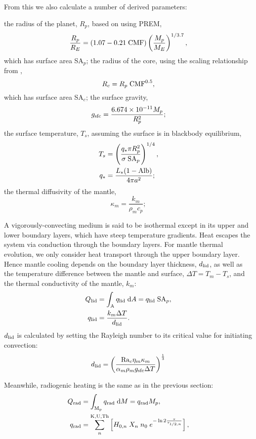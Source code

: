 \documentclass[10pt,a4paper]{article}
\begin{document}
From this we also calculate a number of derived parameters:

the radius of the planet, $R_p$, based on \citet{Zeng2016} using PREM,
\begin{equation}
\frac{R_p}{R_E} = (1.07 - 0.21\; {\rm CMF})\left(\frac{M_p}{M_E}\right)^{1/3.7},
\end{equation}
which has surface area SA$_p$; the radius of the core, using the scaling relationship from \citet{Zeng2017},
\begin{equation}
R_c = R_p \; {\rm CMF}^{0.5},
\end{equation}
which has surface area SA$_c$; the surface gravity,
\begin{equation}
g_{\rm sfc} =\frac{6.674\times 10^{-11}M_p}{R_p^2};
\end{equation}
the surface temperature, $T_s$, assuming the surface is in blackbody equilibrium,
\begin{align}
T_s &= \left(\frac{q_* \pi R_p^2}{\sigma \; {\rm SA}_p}\right)^{1/4},\\
q_* &= \frac{L_*(1-{\rm Alb})}{4 \pi a^2};
\end{align}
the thermal diffusivity of the mantle,
\begin{equation}
\kappa_m = \frac{k_m}{\rho_m c_p};
\end{equation}

A vigorously-convecting medium is said to be isothermal except in its upper and lower boundary layers, which have steep temperature gradients.  Heat escapes the system via conduction through the boundary layers. For mantle thermal evolution, we only consider heat transport through the upper boundary layer. Hence mantle cooling depends on the boundary layer thickness, $d_{\rm lid}$, as well as the temperature difference between the mantle and surface, $\Delta T = T_m - T_s$, and the thermal conductivity of the mantle, $k_m$:
\begin{align}
Q_{\rm lid} &= \int_{\rm A} q_{\rm lid} \; {\rm d}A = q_{\rm lid} \; {\rm SA}_p,\\
q_{\rm lid} &= \frac{k_m \Delta T}{d_{\rm lid}}.
\end{align}
$d_{\rm lid}$ is calculated by setting the Rayleigh number to its critical value for initiating convection:
\begin{equation}
d_{\rm lid} = \left(\frac{{\rm Ra}_c \eta_m \kappa_m}{\alpha_m \rho_m g_{\rm sfc} \Delta T}\right)^{\frac{1}{3}}
\end{equation}

Meanwhile, radiogenic heating is the same as in the previous section:
\begin{align}
Q_{\rm rad} &= \int_{\rm M_p} q_{\rm rad} \; {\rm d}M = q_{\rm rad} M_p,\\
q_{\rm rad} &= \sum^{\rm K, U, Th}_n \left[ H_{0, n} \; X_n \; n_0 \; e^{-\ln 2 \frac{\tau}{\tau_{1/2 ,n}}} \right],
\end{align}
\end{document}
